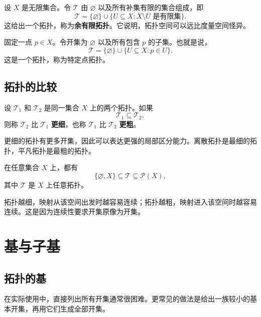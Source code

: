 \begin{example}[余有限拓扑]
设 $X$ 是无限集合。令 $\mathcal{T}$ 由 $\varnothing$ 以及所有补集有限的集合组成，即
\[
    \mathcal{T}=\{\varnothing\}\cup\{U\subseteq X:X\setminus U\text{ 是有限集}\}.
\]
这给出一个拓扑，称为\textbf{余有限拓扑}。它说明，拓扑空间可以远比度量空间怪异。
\end{example}

\begin{example}[特定点拓扑]
固定一点 $p\in X$。令开集为 $\varnothing$ 以及所有包含 $p$ 的子集。也就是说，
\[
    \mathcal{T}=\{\varnothing\}\cup\{U\subseteq X:p\in U\}.
\]
这是一个拓扑，称为特定点拓扑。
\end{example}

\subsection{拓扑的比较}

\begin{definition}[更细与更粗]
设 $\mathcal{T}_1$ 和 $\mathcal{T}_2$ 是同一集合 $X$ 上的两个拓扑。如果
\[
    \mathcal{T}_1\subseteq\mathcal{T}_2,
\]
则称 $\mathcal{T}_2$ 比 $\mathcal{T}_1$ \textbf{更细}，也称 $\mathcal{T}_1$ 比 $\mathcal{T}_2$ \textbf{更粗}。
\end{definition}

更细的拓扑有更多开集，因此可以表达更强的局部区分能力。离散拓扑是最细的拓扑，平凡拓扑是最粗的拓扑。

\begin{example}
在任意集合 $X$ 上，都有
\[
    \{\varnothing,X\}\subseteq\mathcal{T}\subseteq\mathcal{P}(X),
\]
其中 $\mathcal{T}$ 是 $X$ 上任意拓扑。
\end{example}

\begin{remark}
拓扑越细，映射从该空间出发时越容易连续；拓扑越粗，映射进入该空间时越容易连续。这是因为连续性要求开集原像为开集。
\end{remark}

\section{基与子基}

\subsection{拓扑的基}

在实际使用中，直接列出所有开集通常很困难。更常见的做法是给出一族较小的基本开集，再用它们生成全部开集。

